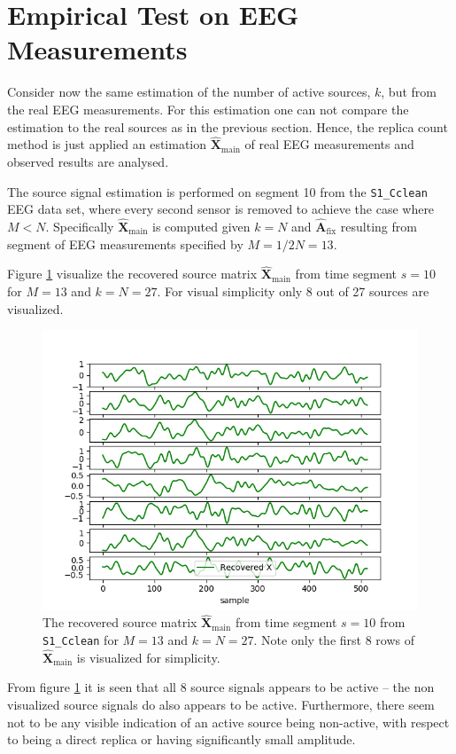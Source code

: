 \section{Empirical Test on EEG Measurements}
Consider now the same estimation of the number of active sources, $k$, but from the real EEG measurements. 
For this estimation one can not compare the estimation to the real sources as in the previous section.
Hence, the replica count method is just applied an estimation $\hat{\mathbf{X}}_{\text{main}}$ of real EEG measurements and observed results are analysed.

The source signal estimation is performed on segment 10 from the \texttt{S1\_Cclean} EEG data set, where every second sensor is removed to achieve the case where $M < N$.
Specifically $\hat{\mathbf{X}}_{\text{main}}$ is computed given $k = N$ and $\hat{\textbf{A}}_{\text{fix}}$ resulting from segment of EEG measurements specified by $M = 1/2 N = 13$. 

Figure \ref{fig:eeg_k} visualize the recovered source matrix $\hat{\mathbf{X}}_{\text{main}}$ from time segment $s = 10$ for $M = 13$ and $k = N = 27$. For visual simplicity only 8 out of 27 sources are visualized.
\begin{figure}[H]
    \centering
	\includegraphics[scale=0.5]{figures/ch_estimate/eeg_k_timeseg_10.png}
	\caption{The recovered source matrix $\hat{\mathbf{X}}_{\text{main}}$ from time segment $s = 10$ from \texttt{S1\_Cclean} for $M = 13$ and $k = N = 27$. Note only the first 8 rows of $\hat{\mathbf{X}}_{\text{main}}$ is visualized for simplicity.}
	\label{fig:eeg_k}
\end{figure}
\noindent
From figure \ref{fig:eeg_k} it is seen that all $8$ source signals appears to be active -- the non visualized source signals do also appears to be active.
Furthermore, there seem not to be any visible indication of an active source being non-active, with respect to being a direct replica or having significantly small amplitude. 

